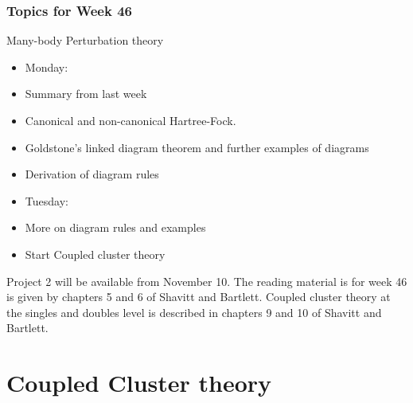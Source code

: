 \documentclass[compress]{beamer}
\begin{document}
\frame
{
  \frametitle{Topics for Week 46}
  \begin{block}{Many-body Perturbation theory}
\begin{itemize}
\item Monday:
\item Summary from last week
\item Canonical and non-canonical Hartree-Fock.  
\item Goldstone's linked diagram theorem and further examples of diagrams
\item Derivation of diagram rules
\item Tuesday:
\item More on diagram rules and examples
\item Start Coupled cluster theory
\end{itemize}
Project 2 will be available from November 10.  The reading material is for week 46 is given by chapters 5 and 6 of Shavitt and Bartlett.  Coupled cluster theory at the singles and doubles level is described in chapters 9 and 10 of Shavitt and Bartlett. 
  \end{block}
} 

\section{Coupled Cluster theory}







\end{document}
